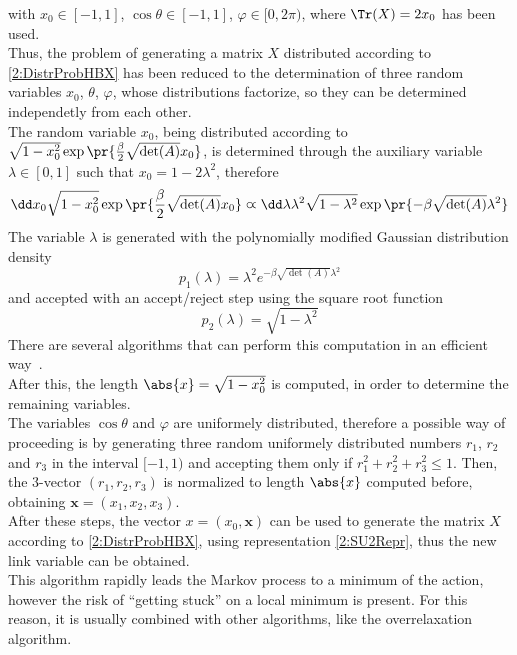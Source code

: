 with $x_0\in[-1,1]$, $\cos\theta\in[-1,1]$, $\varphi\in[0,2\pi)$, where $\Tr(X)=2x_0$ has been used.\\
Thus, the problem of generating a matrix $X$ distributed according to \eqref{2:DistrProbHBX} has been reduced to the determination of three random variables $x_0$, $\theta$, $\varphi$, whose distributions factorize, so they can be determined independetly from each other.\\
The random variable $x_0$, being distributed according to $\sqrt{1-x_0^2} \exp\pr{\frac\beta2 \sqrt{\det(A)}x_0}$, is determined through the auxiliary variable $\lambda\in[0,1]$ such that $x_0 = 1-2\lambda^2$, therefore
\begin{equation}
    \dd x_0\sqrt{1-x_0^2} \exp\pr{\frac\beta2 \sqrt{\det(A)}x_0} \varpropto \dd\lambda\lambda^2\sqrt{1-\lambda^2} \exp\pr{-\beta \sqrt{\det(A)}\lambda^2} \label{2:LambdaDistrHB}
\end{equation}
The variable $\lambda$ is generated with the polynomially modified Gaussian distribution density
\begin{equation}
    p_1(\lambda) = \lambda^2 e^{-\beta \sqrt{\det(A)}\lambda^2}
\end{equation}
and accepted with an accept/reject step using the square root function
\begin{equation}
    p_2(\lambda) = \sqrt{1-\lambda^2}
\end{equation}
There are several algorithms that can perform this computation in an efficient way~\cite{1998art, luscher1994portable}.\\
After this, the length $\abs{x} = \sqrt{1-x_0^2}$ is computed, in order to determine the remaining variables.\\
The variables $\cos\theta$ and $\varphi$ are uniformely distributed, therefore a possible way of proceeding is by generating three random uniformely distributed numbers $r_1$, $r_2$ and $r_3$ in the interval $[-1,1)$ and accepting them only if $r_1^2+r_2^2+r_3^2\leq1$.
Then, the $3$-vector $(r_1,r_2,r_3)$ is normalized to length $\abs{x}$ computed before, obtaining $\bm{x} = (x_1,x_2,x_3)$.\\
After these steps, the vector $x=(x_0,\bm{x})$ can be used to generate the matrix $X$ according to \eqref{2:DistrProbHBX}, using representation \eqref{2:SU2Repr}, thus the new link variable can be obtained.\\
This algorithm rapidly leads the Markov process to a minimum of the action, however the risk of ``getting stuck'' on a local minimum is present.
For this reason, it is usually combined with other algorithms, like the overrelaxation algorithm.

